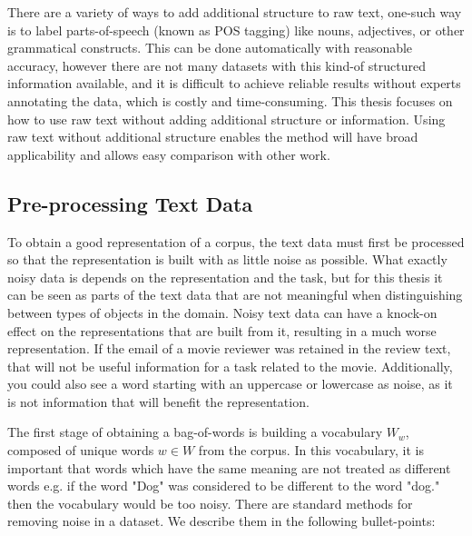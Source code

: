There are a variety of ways to add additional structure to raw text, one-such way is to label parts-of-speech (known as POS tagging) like nouns, adjectives, or other grammatical constructs. This can be done automatically with reasonable accuracy, however there are not many datasets with this kind-of structured information available, and it is difficult to achieve reliable results without experts annotating the data, which is costly and time-consuming. This thesis focuses on how to use raw text without adding additional structure or information. Using raw text without additional structure enables the method will have broad applicability and allows easy comparison with other work.


\subsection{Pre-processing Text Data}\label{ch2:data}



To obtain a good representation of a corpus, the text data must first be processed so that the representation is built with as little noise as possible. What exactly noisy data is depends on the representation and the task, but for this thesis it can be seen as parts of the text data that are not meaningful when distinguishing between types of objects in the domain. Noisy text data can have a knock-on effect on the representations that are built from it, resulting in a much worse representation. If the email of a movie reviewer was retained in the review text, that will not be useful information for a task related to the movie. Additionally, you could also see  a word starting with an uppercase or lowercase as noise, as it is not information that will benefit the representation. %


The first stage of obtaining a bag-of-words is building a vocabulary $W_w$, composed of unique words $w \in W$ from the corpus. In this vocabulary, it is important that words which have the same meaning are not treated as different words e.g. if the word "Dog" was considered to be different to the word "dog." then the vocabulary would be too noisy. There are standard methods for removing noise in a dataset. We describe them in the following bullet-points: %

